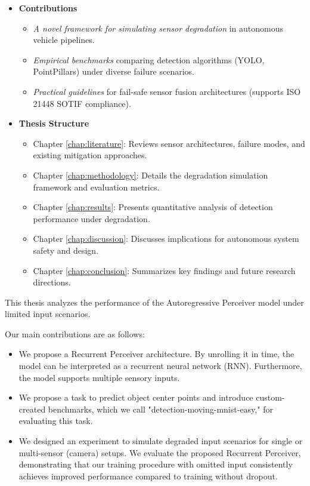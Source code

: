 \begin{itemize}
    \item \textbf{Contributions}
    \begin{itemize}
        \item \textit{A novel framework for simulating sensor degradation} in autonomous vehicle pipelines.
        \item \textit{Empirical benchmarks} comparing detection algorithms (YOLO, PointPillars) under diverse failure scenarios.
        \item \textit{Practical guidelines} for fail-safe sensor fusion architectures (supports ISO 21448 SOTIF compliance).
    \end{itemize}
    
    \item \textbf{Thesis Structure}
    \begin{itemize}
        \item Chapter \ref{chap:literature}: Reviews sensor architectures, failure modes, and existing mitigation approaches.
        \item Chapter \ref{chap:methodology}: Details the degradation simulation framework and evaluation metrics.
        \item Chapter \ref{chap:results}: Presents quantitative analysis of detection performance under degradation.
        \item Chapter \ref{chap:discussion}: Discusses implications for autonomous system safety and design.
        \item Chapter \ref{chap:conclusion}: Summarizes key findings and future research directions.
    \end{itemize}
\end{itemize}

This thesis analyzes the performance of the Autoregressive Perceiver model under limited input scenarios.

Our main contributions are as follows:

\begin{itemize}
\item We propose a Recurrent Perceiver architecture. By unrolling it in time, the model can be interpreted as a recurrent neural network (RNN). Furthermore, the model supports multiple sensory inputs.
\item We propose a task to predict object center points and introduce custom-created benchmarks, which we call "detection-moving-mnist-easy," for evaluating this task.
\item We designed an experiment to simulate degraded input scenarios for single or multi-sensor (camera) setups. We evaluate the proposed Recurrent Perceiver, demonstrating that our training procedure with omitted input consistently achieves improved performance compared to training without dropout.
\end{itemize}


